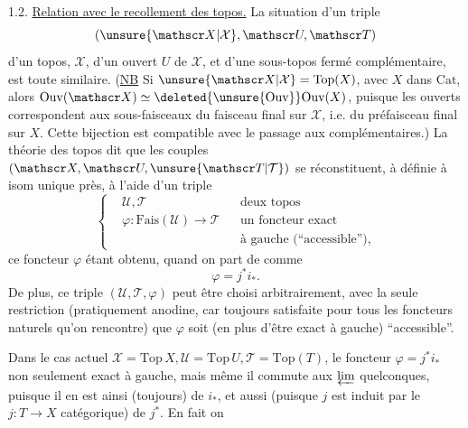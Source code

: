  1.2. \uline{Relation avec le recollement des topos.}
La situation d'un triple 
\[
(\unsure{\mathscr X|\mathcal X},\mathscr U,\mathscr T)
\]
d'un topos, $\mathscr X$, d'un ouvert $U$ de $\mathscr X$, et d'une
sous-topos fermé complémentaire, est toute similaire.
(\uline{NB} Si $\unsure{\mathscr X|\mathcal X}=\mathrm{Top}(X)$, avec $X$ dans $\mathrm{Cat}$, alors $\mathrm{Ouv}(\mathscr X)\simeq\deleted{\unsure{\mathrm{Ouv}}}\mathrm{Ouv}(X)$, puisque les ouverts correspondent aux sous-faisceaux du faisceau final sur $\mathscr X$, i.e. du préfaisceau final sur $X$. Cette bijection est compatible avec le passage aux complémentaires.)
La théorie des topos dit que les couples $(\mathscr X,\mathscr U,\unsure{\mathscr T|\mathcal T})$ se réconstituent, à  définie à isom unique près, à l'aide d'un triple
\[
\left\{\begin{aligned}&\mathscr U,\mathscr T&&\text{deux topos}\\ &\varphi:\mathrm{Fais}(\mathscr U)\longrightarrow\mathscr T &&\text{un foncteur exact}\\ &&&\text{à gauche (``accessible''),}\end{aligned}\right.
\]
ce foncteur $\varphi$ étant obtenu, quand on part de
comme
\[
\varphi=j^*i_*.
\]
De plus, ce triple $(\mathscr U,\mathscr T,\varphi)$ peut être choisi arbitrairement, avec la seule restriction (pratiquement anodine, car toujours satisfaite pour tous les foncteurs naturels qu'on rencontre) que $\varphi$ soit (en plus d'être exact à gauche) ``accessible''.

Dans le cas actuel  $\mathscr X=\mathrm{Top}\,X,\mathscr U=\mathrm{Top}\,U,\mathscr T=\mathrm{Top}(T)$, le foncteur  $\varphi=j^*i_*$  non seulement exact à gauche, mais même il commute aux $\varprojlim$ quelconques, puisque il en est ainsi (toujours) de $i_*$, et aussi (puisque  $j$  est induit par le $j:T\longrightarrow X$ catégorique) de $j^*$. En fait on
